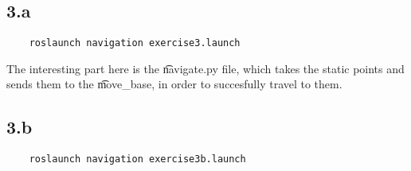

\subsection*{3.a}
\begin{lstlisting}
	roslaunch navigation exercise3.launch
\end{lstlisting}

The interesting part here is the \t{navigate.py} file, which takes the static points and sends them to the \t{move_base}, in order to succesfully travel to them.


\subsection*{3.b}
\begin{lstlisting}
	roslaunch navigation exercise3b.launch
\end{lstlisting}
